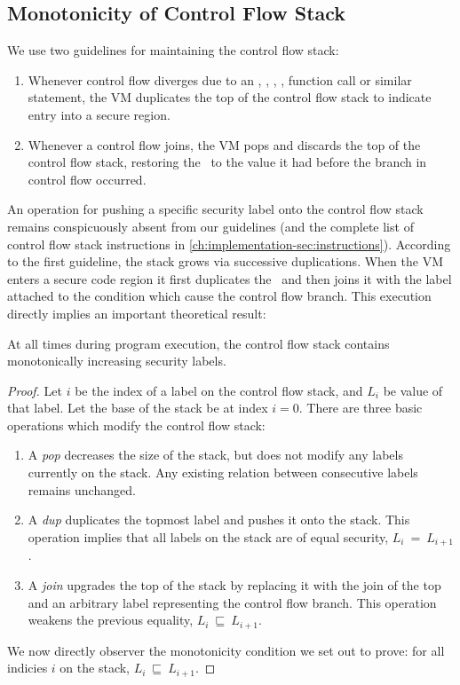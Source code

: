 \subsection{Monotonicity of Control Flow Stack}

We use two guidelines for maintaining the control flow stack:
\begin{enumerate}
 \item Whenever control flow diverges due to an , , , , function call or similar statement, the VM duplicates the top of the control flow stack to indicate entry into a secure region.
 \item Whenever a control flow joins, the VM pops and discards the top of the control flow stack, restoring the \pclabel\ to the value it had before the branch in control flow occurred.
\end{enumerate}

An operation for pushing a specific security label onto the control flow stack remains conspicuously absent from our guidelines (and the complete list of control flow stack instructions in \autoref{ch:implementation-sec:instructions}).
According to the first guideline, the stack grows via successive duplications.
When the VM enters a secure code region it first duplicates the \pclabel\ and then joins it with the label attached to the condition which cause the control flow branch.
This execution directly implies an important theoretical result:
\begin{theorem}
  At all times during program execution, the control flow stack contains monotonically increasing security labels.
\end{theorem}
\begin{proof}
 Let $i$ be the index of a label on the control flow stack, and $L_i$ be value of that label.
 Let the base of the stack be at index $i=0$.
 There are three basic operations which modify the control flow stack:
 \begin{enumerate}
  \item A \textit{pop} decreases the size of the stack, but does not modify any labels currently on the stack. Any existing relation between consecutive labels remains unchanged.
  \item A \textit{dup} duplicates the topmost label and pushes it onto the stack. This operation implies that all labels on the stack are of equal security, $L_i~=~L_{i+1}$.
  \item A \textit{join} upgrades the top of the stack by replacing it with the join of the top and an arbitrary label representing the control flow branch. This operation weakens the previous equality, $L_i~\sqsubseteq~L_{i+1}$.
 \end{enumerate}
 We now directly observer the monotonicity condition we set out to prove: for all indicies $i$ on the stack, $L_i~\sqsubseteq~L_{i+1}$.
\end{proof}

